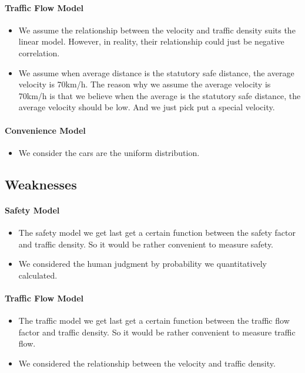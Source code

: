 \paragraph{Traffic Flow Model}

\begin{itemize}
\item We assume the relationship between the velocity and traffic density suits the linear model. However, in reality, their relationship could just be negative correlation.
\item We assume when average distance is the statutory safe distance, the average  velocity is 70km/h. The reason why we assume the average velocity is 70km/h is that we believe when the average is the statutory safe distance, the average velocity should be low. And we just pick put a special velocity.
\end{itemize}

\paragraph{Convenience Model}
\begin{itemize}
\item We consider the cars are the uniform distribution.
\end{itemize}

\subsection{Weaknesses}
\paragraph{Safety Model}

\begin{itemize}
\item The safety model we get last get a certain function between the safety factor and traffic density. So it would be rather convenient to measure safety.
\item We considered the human judgment by probability we quantitatively calculated.
\end{itemize}

\paragraph{Traffic Flow Model}
\begin{itemize}
\item The traffic model we get last get a certain function between the traffic flow factor and traffic density. So it would be rather convenient to measure traffic flow.
\item We considered the relationship between the velocity and traffic density.
\end{itemize}

